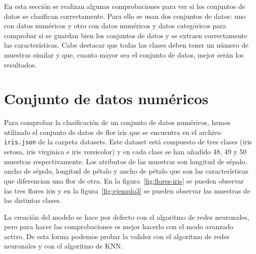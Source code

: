 \documentclass[a4paper, 12pt]{book}
\begin{document}
En esta sección se realizan algunas comprobaciones para ver si los conjuntos de datos se clasifican correctamente.
Para ello se usan dos conjuntos de datos: uno con datos numéricos y otro con datos numéricos y datos categóricos para comprobar si se guardan bien los conjuntos de datos y se extraen correctamente las características. 
Cabe destacar que todas las clases deben tener un número de muestras similar y que, cuanto mayor sea el conjunto de datos, mejor serán los resultados.

\section{Conjunto de datos numéricos}
\label{subsec:numericos}

Para comprobar la clasificación de un conjunto de datos numéricos, hemos utilizado el conjunto de datos de flor iris que se encuentra en el archivo \texttt{iris.json} de la carpeta datasets. Este dataset está compuesto de tres clases (iris setosa, iris virginica e iris versicolor) y en cada clase se han añadido 48, 49 y 50 muestras respectivamente. 
Los atributos de las muestras son longitud de sépalo, ancho de sépalo, longitud de pétalo y ancho de pétalo que son las características que diferencian una flor de otra. 
En la figura~\ref{fig:flores-iris} se pueden observar las tres flores iris y en la figura~\ref{fig:ejemplo3} se pueden observar las muestras de las distintas clases.

La creación del modelo se hace por defecto con el algoritmo de redes neuronales, pero para hacer las comprobaciones es mejor hacerlo con el modo avanzado activo. De esta forma podemos probar la validez con el algoritmo de redes neuronales y con el algoritmo de KNN.
\end{document}
